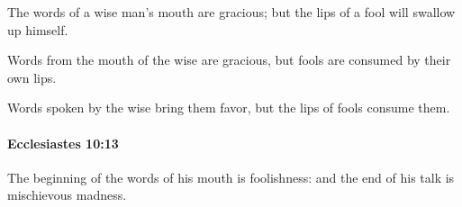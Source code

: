 			\begin{versebox}
					\item[BHS] 
					\item[LXX] 
					\item[ASV] The words of a wise man's mouth are gracious; but the lips of a fool will swallow up himself.
					\item[NIV] Words from the mouth of the wise are gracious, but fools are consumed by their own lips.
					\item[NRSV] Words spoken by the wise bring them favor, but the lips of fools consume them.
			\end{versebox}

		\paragraph{Ecclesiastes 10:13} %
			\label{ECCLESIASTES-10-13}

			The beginning of the words of his mouth is foolishness: and the end of his talk is mischievous madness.

